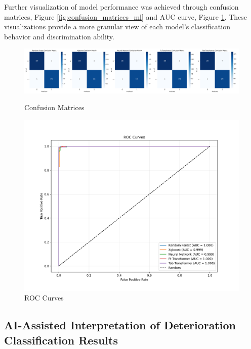 Further visualization of model performance was achieved through confusion matrices, Figure \ref{fig:confusion_matrices_ml} and AUC curve, Figure \ref{fig:roc_curves_ml}. These visualizations provide a more granular view of each model's classification behavior and discrimination ability.

\begin{figure}[httpb] %
    \centering
    \begin{minipage}{0.45\textwidth}
        \centering
        \includegraphics[width=\textwidth]{../images/ml_confusion_matrices.png} %
        \caption{Confusion Matrices}
        \label{fig:confusion_matrices_ml}
    \end{minipage}
    \hfill
    \begin{minipage}{0.45\textwidth}
        \centering
        \includegraphics[width=\textwidth]{../images/ml_roc_curves.png} %
        \caption{ROC Curves}
        \label{fig:roc_curves_ml}
    \end{minipage}
\end{figure}

\subsection{AI-Assisted Interpretation of Deterioration Classification Results}

